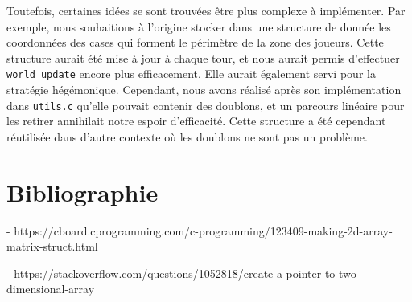 \documentclass{article}
\begin{document}
	Toutefois, certaines idées se sont trouvées être plus complexe à implémenter. Par exemple, nous souhaitions à l'origine stocker dans une structure de donnée les coordonnées des cases qui forment le périmètre de la zone des joueurs. Cette structure aurait été mise à jour à chaque tour, et nous aurait permis d'effectuer \texttt{world_update} encore plus efficacement. Elle aurait également servi pour la stratégie hégémonique. Cependant, nous avons réalisé après son implémentation dans \texttt{utils.c} qu'elle pouvait contenir des doublons, et un parcours linéaire pour les retirer annihilait notre espoir d'efficacité. Cette structure a été cependant réutilisée dans d'autre contexte où les doublons ne sont pas un problème.

\section{Bibliographie}

- https://cboard.cprogramming.com/c-programming/123409-making-2d-array-matrix-struct.html

- https://stackoverflow.com/questions/1052818/create-a-pointer-to-two-dimensional-array
\end{document}

